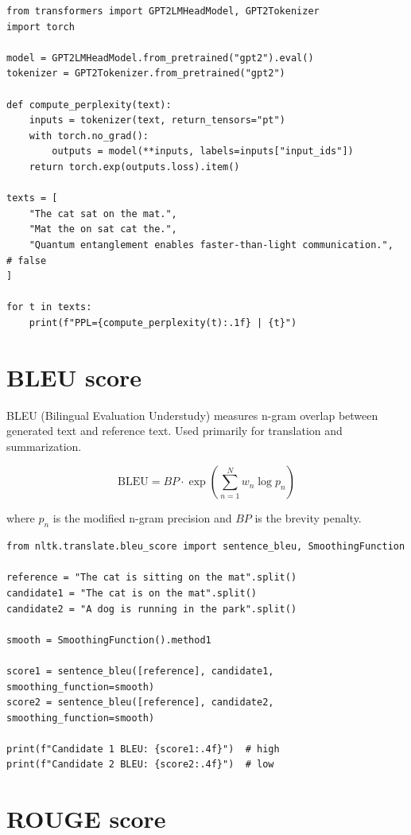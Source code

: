 \begin{verbatim}
from transformers import GPT2LMHeadModel, GPT2Tokenizer
import torch

model = GPT2LMHeadModel.from_pretrained("gpt2").eval()
tokenizer = GPT2Tokenizer.from_pretrained("gpt2")

def compute_perplexity(text):
    inputs = tokenizer(text, return_tensors="pt")
    with torch.no_grad():
        outputs = model(**inputs, labels=inputs["input_ids"])
    return torch.exp(outputs.loss).item()

texts = [
    "The cat sat on the mat.",
    "Mat the on sat cat the.",
    "Quantum entanglement enables faster-than-light communication.",  # false
]

for t in texts:
    print(f"PPL={compute_perplexity(t):.1f} | {t}")
\end{verbatim}

\section{BLEU score}

BLEU (Bilingual Evaluation Understudy) measures n-gram overlap between generated text and reference text. Used primarily for translation and summarization.

\[
\text{BLEU} = BP \cdot \exp\left(\sum_{n=1}^{N} w_n \log p_n\right)
\]

where $p_n$ is the modified n-gram precision and $BP$ is the brevity penalty.

\begin{verbatim}
from nltk.translate.bleu_score import sentence_bleu, SmoothingFunction

reference = "The cat is sitting on the mat".split()
candidate1 = "The cat is on the mat".split()
candidate2 = "A dog is running in the park".split()

smooth = SmoothingFunction().method1

score1 = sentence_bleu([reference], candidate1, smoothing_function=smooth)
score2 = sentence_bleu([reference], candidate2, smoothing_function=smooth)

print(f"Candidate 1 BLEU: {score1:.4f}")  # high
print(f"Candidate 2 BLEU: {score2:.4f}")  # low
\end{verbatim}

\section{ROUGE score}

